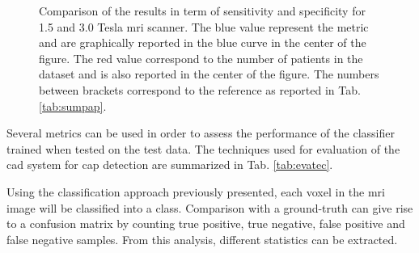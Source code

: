 \begin{figure}
{
}
\hspace*{\fill}
\caption{Comparison of the results in term of sensitivity and specificity for 1.5 and 3.0 Tesla \ac{mri} scanner. The blue value represent the metric and are graphically reported in the blue curve in the center of the figure. The red value correspond to the number of patients in the dataset and is also reported in the center of the figure. The numbers between brackets correspond to the reference as reported in Tab. \ref{tab:sumpap}.}
\label{fig:sensspec}
\end{figure}

Several metrics can be used in order to assess the performance of the classifier trained when tested on the test data. The techniques used for evaluation of the \ac{cad} system for \ac{cap} detection are summarized in Tab. \ref{tab:evatec}.

Using the classification approach previously presented, each voxel in the \ac{mri} image will be classified into a class. Comparison with a ground-truth can give rise to a confusion matrix by counting true positive, true negative, false positive and false negative samples. From this analysis, different statistics can be extracted. 

